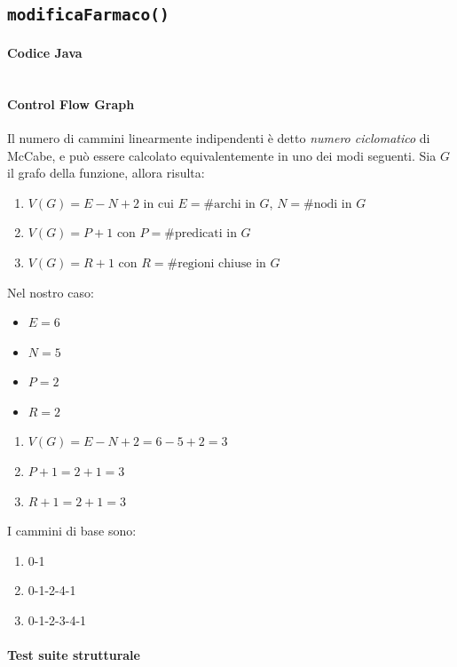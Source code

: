 

\subsection{\texttt{modificaFarmaco()}}

\paragraph{Codice Java}

\inputminted[breaklines,tabsize=4,linenos]{java}{chapters/testing_white_box/modificaFarmaco.java}

\vfill

\pagebreak

\paragraph{Control Flow Graph}\mbox{}\newline

\noindent\begin{minipage}[t]{0.58\linewidth}
	\vspace{0pt}
	Il numero di cammini linearmente indipendenti è detto \emph{numero ciclomatico} di McCabe, e può essere calcolato equivalentemente in uno dei modi seguenti. Sia $G$ il grafo della funzione, allora risulta:
	\begin{enumerate}
		\item $V(G) = E - N + 2$ in cui $E = \text{\#archi in } G$, $N = \text{\#nodi in } G$
		\item $V(G) = P + 1$ con $P = \text{\#predicati in } G$
		\item $V(G) = R + 1$ con $R = \text{\#regioni chiuse in } G$
	\end{enumerate}%
	Nel nostro caso:%
	\begin{itemize}
		\item $E = 6$
		\item $N = 5$
		\item $P = 2$
		\item $R = 2$
	\end{itemize}%
	\begin{enumerate}
		\item $V(G) = E - N + 2 = 6 - 5 + 2 = 3$
		\item $P + 1 = 2 + 1 = 3$
		\item $R + 1 = 2 + 1 = 3$
	\end{enumerate}%
	\noindent I cammini di base sono:
	\begin{enumerate}
		\item 0-1
		\item 0-1-2-4-1
		\item 0-1-2-3-4-1
	\end{enumerate}
\end{minipage}
\hfill
\noindent\begin{minipage}[t]{0.38\linewidth}
	\vspace{0pt}
	
\end{minipage}

\vfill
\pagebreak

\paragraph{Test suite strutturale}\mbox{}\newline


